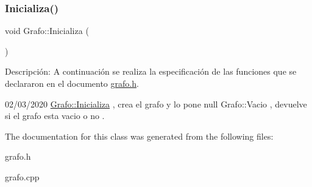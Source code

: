 \subsubsection{\texorpdfstring{Inicializa()}{Inicializa()}}
{\footnotesize\ttfamily void Grafo\+::\+Inicializa (\begin{DoxyParamCaption}{ }\end{DoxyParamCaption})}



Descripción\+: A continuación se realiza la especificación de las funciones que se declararon en el documento \hyperlink{grafo_8h_source}{grafo.\+h}. 

02/03/2020 \hyperlink{class_grafo_ad0ae89382a426e06cedf7168dc474820}{Grafo\+::\+Inicializa} , crea el grafo y lo pone null Grafo\+::\+Vacio , devuelve si el grafo esta vacio o no .

The documentation for this class was generated from the following files\+:\begin{DoxyCompactItemize}
\item 
grafo.\+h\item 
grafo.\+cpp\end{DoxyCompactItemize}
